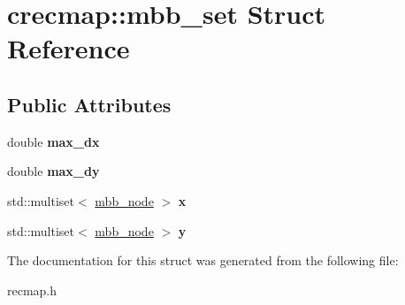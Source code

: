 \hypertarget{structcrecmap_1_1mbb__set}{\section{crecmap\+:\+:mbb\+\_\+set Struct Reference}
\label{structcrecmap_1_1mbb__set}
}
\subsection*{Public Attributes}
\begin{DoxyCompactItemize}
\item 
\hypertarget{structcrecmap_1_1mbb__set_a1307ff6aec408999c6f348bb42efa150}{double {\bfseries max\+\_\+dx}}\label{structcrecmap_1_1mbb__set_a1307ff6aec408999c6f348bb42efa150}

\item 
\hypertarget{structcrecmap_1_1mbb__set_a501f690ba4cbd602aec52c72c8abae05}{double {\bfseries max\+\_\+dy}}\label{structcrecmap_1_1mbb__set_a501f690ba4cbd602aec52c72c8abae05}

\item 
\hypertarget{structcrecmap_1_1mbb__set_a6dcb7bc9df15fd92ec6974cc876227de}{std\+::multiset$<$ \hyperlink{structcrecmap_1_1mbb__node}{mbb\+\_\+node} $>$ {\bfseries x}}\label{structcrecmap_1_1mbb__set_a6dcb7bc9df15fd92ec6974cc876227de}

\item 
\hypertarget{structcrecmap_1_1mbb__set_a63688e8e02c3a13bf971ea06bd3b084c}{std\+::multiset$<$ \hyperlink{structcrecmap_1_1mbb__node}{mbb\+\_\+node} $>$ {\bfseries y}}\label{structcrecmap_1_1mbb__set_a63688e8e02c3a13bf971ea06bd3b084c}

\end{DoxyCompactItemize}


The documentation for this struct was generated from the following file\+:\begin{DoxyCompactItemize}
\item 
recmap.\+h\end{DoxyCompactItemize}
